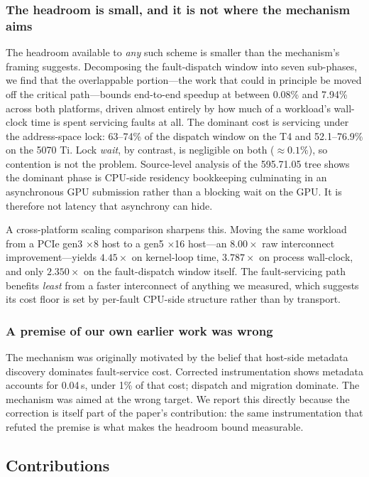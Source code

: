 \subsubsection*{The headroom is small, and it is not where the mechanism aims}
The headroom available to \emph{any} such scheme is smaller than the mechanism's
framing suggests. Decomposing the fault-dispatch window into seven sub-phases,
we find that the overlappable portion---the work that could in principle be
moved off the critical path---bounds end-to-end speedup at between 0.08\% and
7.94\% across both platforms, driven almost entirely by how much of a workload's
wall-clock time is spent servicing faults at all. The dominant cost is servicing
under the address-space lock: 63--74\% of the dispatch window on the T4 and
52.1--76.9\% on the 5070 Ti. Lock \emph{wait}, by contrast, is negligible on both
($\approx 0.1\%$), so contention is not the problem. Source-level analysis of
the 595.71.05 tree shows the dominant phase is CPU-side residency bookkeeping
culminating in an asynchronous GPU submission rather than a blocking wait on the
GPU. It is therefore not latency that asynchrony can hide.

A cross-platform scaling comparison sharpens this. Moving the same workload from
a PCIe gen3 $\times$8 host to a gen5 $\times$16 host---an $8.00\times$ raw
interconnect improvement---yields $4.45\times$ on kernel-loop time,
$3.787\times$ on process wall-clock, and only $2.350\times$ on the fault-dispatch
window itself. The fault-servicing path benefits \emph{least} from a faster
interconnect of anything we measured, which suggests its cost floor is set by
per-fault CPU-side structure rather than by transport.

\subsubsection*{A premise of our own earlier work was wrong}
The mechanism was originally motivated by the belief that host-side metadata
discovery dominates fault-service cost. Corrected instrumentation shows metadata
accounts for 0.04\,\textmu s, under 1\% of that cost; dispatch and
migration dominate. The mechanism was aimed at the wrong target. We report this
directly because the correction is itself part of the paper's contribution: the
same instrumentation that refuted the premise is what makes the headroom bound
measurable.

\subsection{Contributions}

